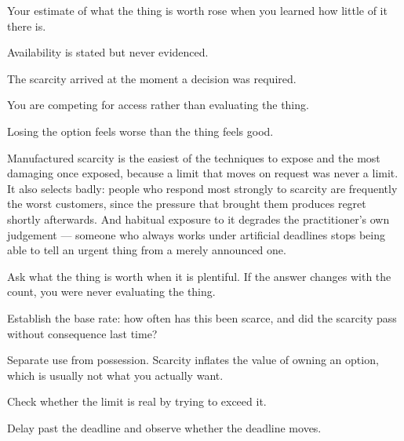 \begin{feedback}
  \item Your estimate of what the thing is worth rose when you learned how little of it there is.
  \item Availability is stated but never evidenced.
  \item The scarcity arrived at the moment a decision was required.
  \item You are competing for access rather than evaluating the thing.
  \item Losing the option feels worse than the thing feels good.
\end{feedback}

\begin{failure}
Manufactured scarcity is the easiest of the techniques to expose and the most damaging once exposed, because a limit that moves on request was never a limit. It also selects badly: people who respond most strongly to scarcity are frequently the worst customers, since the pressure that brought them produces regret shortly afterwards. And habitual exposure to it degrades the practitioner's own judgement --- someone who always works under artificial deadlines stops being able to tell an urgent thing from a merely announced one.
\end{failure}

\begin{countermeasures}
  \item Ask what the thing is worth when it is plentiful. If the answer changes with the count, you were never evaluating the thing.
  \item Establish the base rate: how often has this been scarce, and did the scarcity pass without consequence last time?
  \item Separate use from possession. Scarcity inflates the value of owning an option, which is usually not what you actually want.
  \item Check whether the limit is real by trying to exceed it.
  \item Delay past the deadline and observe whether the deadline moves.
\end{countermeasures}

\seesources
{}
